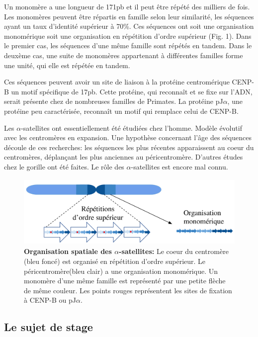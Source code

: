 \documentclass[12pt,a4paper]{article}
\begin{document}
Un monomère a une longueur de 171pb et il peut être répété des milliers de fois. Les monomères peuvent être répartis en famille selon leur similarité, les séquences ayant un taux d'identité supérieur à 70\%. Ces séquences ont soit une organisation monomérique soit une organisation en répétition d'ordre supérieur (Fig. 1). Dans le premier cas, les séquences d'une même famille sont répétés en tandem. Dans le deuxème cas, une suite de monomères appartenant à différentes familles forme une unité, qui elle est répétée en tandem. 

Ces séquences peuvent avoir un site de liaison à la protéine centromérique CENP-B un motif spécifique de 17pb. Cette protéine, qui reconnaît et se fixe sur l'ADN, serait présente chez de nombreuses familles de Primates. La protéine pJ$\alpha$, une protéine peu caractérisée, reconnaît un motif qui remplace celui de CENP-B.

Les $\alpha$-satellites ont essentiellement été étudiées chez l'homme. Modèle évolutif avec les centromères en expansion. Une hypothèse concernant l'âge des séquences découle de ces recherches: les séquences les plus récentes apparaissent au coeur du centromères, déplançant les plus anciennes au péricentromère. D'autres études chez le gorille ont été faites. Le rôle des $\alpha$-satellites est encore mal connu. 

\begin{figure}
	\center
		\includegraphics[height=3.5cm, width=12cm]{img/AS_organization.png}
		\caption{\textbf{Organisation spatiale des $\alpha$-satellites:} Le coeur du centromère (bleu foncé) est organisé en répétition d'ordre supérieur. Le péricentromère(bleu clair) a une organisation monomérique. Un monomère d'une même famille est représenté par une petite flèche de même couleur. Les points rouges représentent les sites de fixation à CENP-B ou pJ$\alpha$.}
\end{figure}

\subsection{Le sujet de stage}
\end{document}
